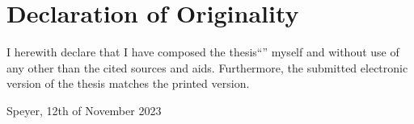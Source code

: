 \clearpage
\chapter*{Declaration of Originality}
\noindent I herewith declare that I have composed the thesis``\textit{\DerTitelDerArbeit}'' myself and without use of any other than the cited sources and aids. Furthermore, the submitted electronic version of 
the thesis matches the printed version.

\vspace{6cm}
Speyer, 12th of November 2023 \hfill \DerAutorDerArbeit
